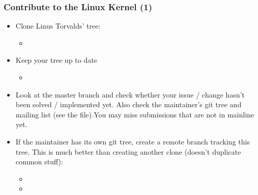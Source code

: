 \begin{frame}
  \frametitle{Contribute to the Linux Kernel (1)}
  \begin{itemize}
  \item Clone Linus Torvalds' tree:
    \begin{itemize}
    \item
    \end{itemize}
  \item Keep your tree up to date
    \begin{itemize}
    \item {}
    \end{itemize}
  \item Look at the master branch and check whether your issue /
    change hasn't been solved / implemented yet. Also check the
    maintainer's git tree and mailing list (see the 
    file).You may miss submissions that are not in mainline yet.
  \item If the maintainer has its own git tree, create a remote branch
    tracking this tree. This is much better than creating another
    clone (doesn't duplicate common stuff):
    \begin{itemize}
    \item
    \item {}
    \end{itemize}
  \end{itemize}
\end{frame}

